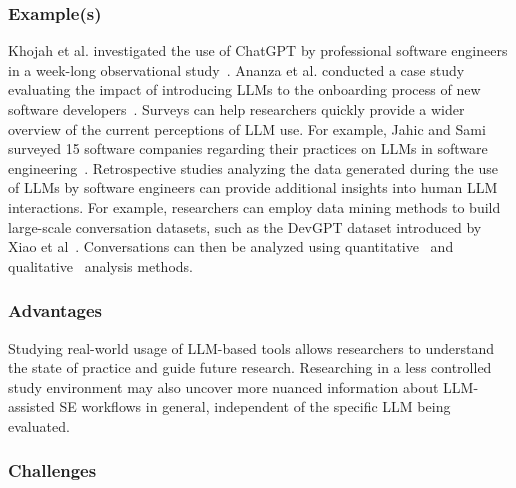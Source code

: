 \subsubsection{Example(s)}

Khojah et al. investigated the use of ChatGPT by professional software engineers in a week-long observational study~\cite{DBLP:journals/pacmse/KhojahM0N24}.
Ananza et al. conducted a case study evaluating the impact of introducing LLMs to the onboarding process of new software developers~\cite{DBLP:conf/csee/AzanzaPIG24}.
Surveys can help researchers quickly provide a wider overview of the current perceptions of LLM use.
For example, Jahic and Sami surveyed 15 software companies regarding their practices on LLMs in software engineering~\cite{DBLP:conf/icsa/JahicS24}.
Retrospective studies analyzing the data generated during the use of LLMs by software engineers can provide additional insights into human LLM interactions.
For example, researchers can employ data mining methods to build large-scale conversation datasets, such as the DevGPT dataset introduced by Xiao et al~\cite{DBLP:conf/msr/XiaoTHM24}.
Conversations can then be analyzed using quantitative~\cite{DBLP:conf/msr/RabbiCZI24} and qualitative~\cite{DBLP:conf/msr/MohamedPP24} analysis methods.

\subsubsection{Advantages}

Studying real-world usage of LLM-based tools allows researchers to understand the state of practice and guide future research.
Researching in a less controlled study environment may also uncover more nuanced information about LLM-assisted SE workflows in general, independent of the specific LLM being evaluated.

\subsubsection{Challenges}

